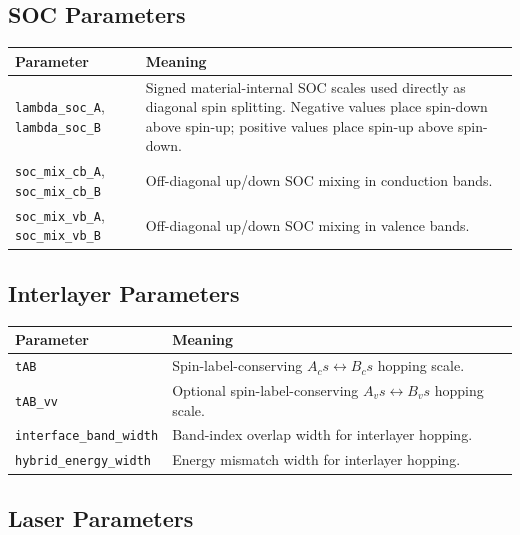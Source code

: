 \documentclass[11pt,a4paper]{article}
\begin{document}
\subsection{SOC Parameters}

\begin{longtable}{p{}p{}}
\toprule
Parameter & Meaning \\
\midrule
\texttt{lambda\_soc\_A}, \texttt{lambda\_soc\_B} & Signed material-internal SOC scales used directly as diagonal spin splitting. Negative values place spin-down above spin-up; positive values place spin-up above spin-down. \\
\texttt{soc\_mix\_cb\_A}, \texttt{soc\_mix\_cb\_B} & Off-diagonal up/down SOC mixing in conduction bands. \\
\texttt{soc\_mix\_vb\_A}, \texttt{soc\_mix\_vb\_B} & Off-diagonal up/down SOC mixing in valence bands. \\
\bottomrule
\end{longtable}

\subsection{Interlayer Parameters}

\begin{longtable}{p{}p{}}
\toprule
Parameter & Meaning \\
\midrule
\texttt{tAB} & Spin-label-conserving $A_c s\leftrightarrow B_c s$ hopping scale. \\
\texttt{tAB\_vv} & Optional spin-label-conserving $A_v s\leftrightarrow B_v s$ hopping scale. \\
\texttt{interface\_band\_width} & Band-index overlap width for interlayer hopping. \\
\texttt{hybrid\_energy\_width} & Energy mismatch width for interlayer hopping. \\
\bottomrule
\end{longtable}

\subsection{Laser Parameters}
\end{document}
